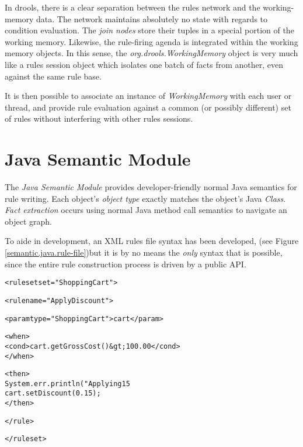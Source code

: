 \documentclass[10pt,letterpaper]{article}
\newenvironment{codelisting}%
	{\begin{minipage}{250pt}\small\begin{alltt}}%
	{\end{alltt}\end{minipage}}
\begin{document}
In drools, there is a clear separation between the rules network 
and the working-memory data.  The network maintains absolutely 
no state with regards to condition evaluation.  The \emph{join nodes}
store their tuples in a special portion of the working memory.
Likewise, the rule-firing agenda is integrated within the working
memory objects.  In this sense, the \emph{org.drools.WorkingMemory}
object is very much like a rules session object which isolates one
batch of facts from another, even against the same rule base.

It is then possible to associate an instance of \emph{WorkingMemory} 
with each user or thread, and provide rule evaluation against a 
common (or possibly different) set of rules without interfering
with other rules sessions.

\section{Java Semantic Module}

The \emph{Java Semantic Module} provides developer-friendly
normal Java semantics for rule writing.  Each object's
\emph{object type} exactly matches the object's Java \emph{Class}.
\emph{Fact extraction} occurs using normal Java method call
semantics to navigate an object graph.

To aide in development, an XML rules file syntax has been developed, 
(see Figure \ref{semantic.java.rule-file})but it is by no means the 
\emph{only} syntax that is possible, since the entire rule
construction process is driven by a public API.

\begin{figure*}
	\begin{codelisting}


<ruleset set="Shopping Cart">

    <rule name="Apply Discount">

        <param type="ShoppingCart">cart</param>

        <when>
            <cond>cart.getGrossCost() &gt; 100.00</cond>
        </when>

        <then>
            System.err.println( "Applying 15%
            cart.setDiscount( 0.15 );
        </then>

    </rule>

</ruleset>


	\end{codelisting}
	\caption{Example \emph{Java Semantic Module} rule file syntax.}
	\label{semantic.java.rule-file}
\end{figure*}
\end{document}
